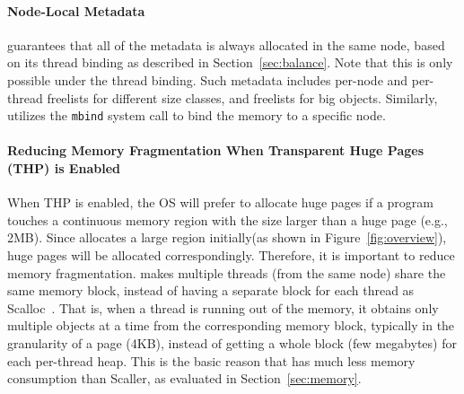 \paragraph{Node-Local Metadata} \NM{} guarantees that all of the metadata is always allocated in the same node, based on its thread binding as described in Section~\ref{sec:balance}. Note that this is only possible under the thread binding. Such metadata includes per-node and per-thread freelists for different size classes, and freelists for big objects. Similarly, \NM{} utilizes the \texttt{mbind} system call to bind the memory to a specific node.  

\paragraph{Reducing Memory Fragmentation When Transparent Huge Pages (THP) is Enabled} When THP is enabled, the OS will prefer to allocate huge pages if a program touches a continuous memory region with the size larger than a huge page (e.g., 2MB). Since \NM{} allocates a large region initially(as shown in Figure~\ref{fig:overview}), huge pages will be allocated correspondingly. Therefore, it is important to reduce memory fragmentation. \NM{} makes multiple threads (from  the same node) share the same memory block, instead of having a separate block for each thread as Scalloc~\cite{Scalloc}. That is, when a thread is running out of the memory, it obtains only multiple objects at a time from the corresponding memory block, typically in the granularity of a page (4KB), instead of getting a whole block (few megabytes) for each per-thread heap. This is the basic reason that \NM{} has much less memory consumption than Scaller, as evaluated in Section~\ref{sec:memory}.  



